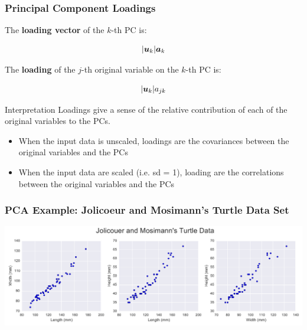 \documentclass{beamer}
\begin{document}
\begin{frame}
  \frametitle{Principal Component Loadings}

The \textbf{loading vector} of the $k$-th PC is:

\[
|\bm{u}_k|\bm{a}_k
\]

The \textbf{loading} of the $j$-th original variable on the $k$-th PC is:

\[
|\bm{u}_k|a_{jk}
\]

\begin{block}{Interpretation}
Loadings give a sense of the relative contribution of each of the original variables to the PCs.

\begin{itemize}
    \item When the input data is unscaled, loadings are the covariances between the original variables and the PCs
    \item When the input data are scaled (i.e. sd = 1), loading are the correlations between the original variables and the PCs
\end{itemize}

\end{block}

\end{frame}

\begin{frame}[fragile]
  \frametitle{PCA Example: Jolicoeur and Mosimann's Turtle Data Set}

\begin{center}
\hspace*{-0.8cm}
\includegraphics[width=0.95\paperwidth]{turtles.pdf}
\end{center}
\end{frame}

\end{document}
